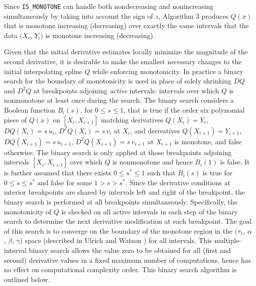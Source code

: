 Since {\tt IS\_MONOTONE} can handle both nondecreasing and
nonincreasing simultaneously by taking into account the sign of $z$,
Algorithm 3 produces $Q(x)$ that is monotone increasing (decreasing)
over exactly the same intervals that the data $(X_i$, $Y_i)$ is
monotone increasing (decreasing).

Given that the initial derivative estimates locally minimize the
magnitude of the second derivative, it is desirable to make the
smallest necessary changes to the initial interpolating spline $Q$
while enforcing monotonicity. In practice a binary search for the
boundary of monotonicity is used in place of solely shrinking $DQ$ and
$D^2Q$ at breakpoints adjoining {\it active\/} intervals: intervals
over which $Q$ is nonmonotone at least once during the search. The
binary search considers a Boolean function $B_i(s)$, for $0 \le s \le
1$, that is true if the order six polynomial piece of $Q(x)$ on $[X_i,
  X_{i+1}]$ matching derivatives $Q(X_i)=Y_i$, $DQ(X_i)=s \,u_i$,
$D^2Q(X_i)=s \,v_i$ at $X_i$, and derivatives $Q(X_{i+1})=Y_{i+1}$,
$DQ(X_{i+1})=s \,u_{i+1}$, $D^2Q(X_{i+1})=s \,v_{i+1}$ at $X_{i+1}$ is
monotone, and false otherwise.  The binary search is only applied at
those breakpoints adjoining intervals $[X_i, X_{i+1}]$ over which $Q$
is nonmonotone and hence $B_i(1)$ is false.  It is further assumed
that there exists $0 \le s^* \le 1$ such that $B_i(s)$ is true for $0
\le s \le s^*$ and false for some $1 > s > s^*$. Since the derivative
conditions at interior breakpoints are shared by intervals left and
right of the breakpoint, the binary search is performed at all
breakpoints simultaneously.  Specifically, the monotonicity of $Q$ is
checked on all active intervals in each step of the binary search to
determine the next derivative modification at each breakpoint. The
goal of this search is to converge on the boundary of the monotone
region in the $(\tau_1$, $\alpha$, $\beta$, $\gamma)$ space (described
in Ulrich and Watson \cite{ulrich1994positivity}) for all
intervals. This multiple-interval binary search allows the value zero
to be obtained for all (first and second) derivative values in a fixed
maximum number of computations, hence has no effect on computational
complexity order. This binary search algorithm is outlined below.


